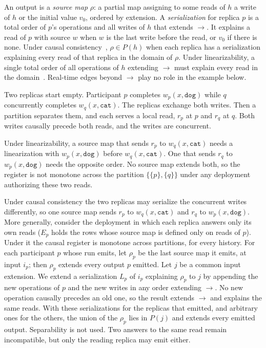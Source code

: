 \documentclass[sigconf]{cidr-2027}
\theoremstyle{remark}
\newcommand{\indesc}{input extension\xspace} %
\newcommand{\outrel}{extends\xspace}          %
\newcommand{\fiber}[1]{P(#1)}
\newcommand{\dog}{\texttt{dog}}
\newcommand{\catv}{\texttt{cat}}
\begin{document}
An output is a \emph{source map} $\rho$: a partial map assigning to some reads
of $h$ a write of $h$ or the initial value $v_0$, ordered by extension. A
\emph{serialization} for replica $p$ is a total order of $p$'s operations and
all writes of $h$ that extends $\to$. It explains a read of $p$ with source
$w$ when $w$ is the last write before the read, or $v_0$ if there is none. Under causal consistency~\cite{lamport1978time,ahamad1995causal},
$\rho\in\fiber{h}$ when each replica has a serialization explaining every read
of that replica in the domain of $\rho$. Under linearizability, a single
total order of all operations of $h$ extending $\to$ must explain every read
in the domain~\cite{herlihy1990linearizability}. Real-time edges beyond $\to$
play no role in the example below.

Two replicas start empty. Participant $p$ completes $w_p(x,\dog)$ while $q$
concurrently completes $w_q(x,\catv)$. The replicas exchange both writes. Then a partition separates them, and each serves a local read, $r_p$ at $p$
and $r_q$ at $q$. Both writes causally precede both reads, and the writes are
concurrent.

Under linearizability, a source map that sends $r_p$ to $w_q(x,\catv)$ needs a
linearization with $w_p(x,\dog)$ before $w_q(x,\catv)$. One that sends $r_q$
to $w_p(x,\dog)$ needs the opposite order. No source map \outrel both, so the
register is not monotone across the partition $\{\{p\},\{q\}\}$ under any
deployment authorizing these two reads.

Under causal consistency the two replicas may serialize the concurrent writes
differently, so one source map sends $r_p$ to $w_q(x,\catv)$ and $r_q$ to
$w_p(x,\dog)$. More generally, consider the deployment in which each replica
answers only its own reads ($E_p$ holds the rows whose source map is defined
only on reads of $p$). Under it the causal register is monotone across
partitions, for every history. For each participant $p$ whose run emits, let
$\rho_p$ be the last source map it emits, at input $i_p$; then $\rho_p$
\outrel every output $p$ emitted. Let $j$ be a common \indesc. We extend a
serialization $L_p$ of $i_p$ explaining $\rho_p$ to $j$ by appending the new
operations of $p$ and the new writes in any order extending $\to$. No new
operation causally precedes an old one, so the result extends $\to$ and
explains the same reads. With these serializations for the replicas that
emitted, and arbitrary ones for the others, the union of the $\rho_p$ lies in
$\fiber{j}$ and \outrel every emitted output. Separability is not used. Two answers to the same read remain incompatible,
but only the reading replica may emit either.
\end{document}
